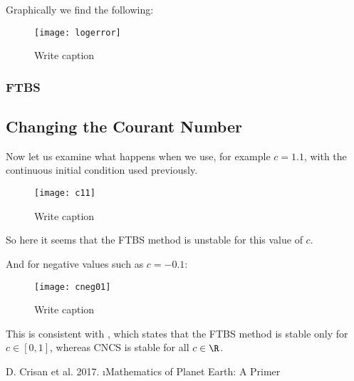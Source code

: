 \documentclass[10pt]{article}
\begin{document}
Graphically we find the following:

\begin{figure}[H]
\centering
\texttt{[image: logerror]}
\caption{Write caption}
\end{figure}

\subsubsection{FTBS}



\subsection{Changing the Courant Number}

Now let us examine what happens when we use, for example $c = 1.1$, with the continuous initial condition used previously.

\begin{figure}[H]
\centering
\texttt{[image: c11]}
\caption{Write caption}
\end{figure}

So here it seems that the FTBS method is unstable for this value of $c$.

And for negative values such as $c = -0.1$: 

\begin{figure}[H]
\centering
\texttt{[image: cneg01]}
\caption{Write caption}
\end{figure}

This is consistent with \cite{MPE}, which states that the FTBS method is stable only for $c\in[0,1]$, whereas CNCS is stable for all $c\in \R$.

\begin{thebibliography}{9}
	 D. Crisan et al. 2017. \i{Mathematics of Planet Earth: A Primer}
\end{thebibliography}
\end{document}
